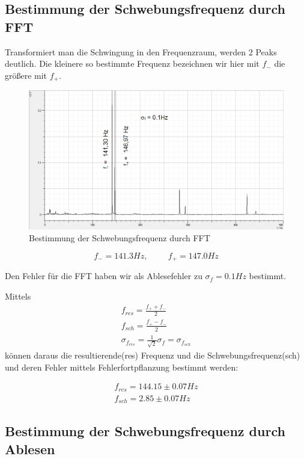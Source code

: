 \documentclass[12pt,a4paper]{article}
\begin{document}
\subsection{Bestimmung der Schwebungsfrequenz durch FFT}
Transformiert man die Schwingung in den Frequenzraum, werden 2 Peaks deutlich. Die kleinere so bestimmte Frequenz bezeichnen wir hier mit $f_-$ die größere mit $f_+$.
\begin{figure}[H]
\centering
\includegraphics[scale=0.5]{schwebung/Schwebung_FFT.png}
\caption{Bestimmung der Schwebungsfrequenz durch FFT}
\end{figure}

\begin{equation}
f_-=141.3 Hz, \hspace{1cm} f_+=147.0 Hz
\end{equation}

Den Fehler für die FFT haben wir als Ablesefehler zu $ \sigma_f=0.1Hz$ bestimmt.

Mittels
\begin{align}
f_{res}=\frac{f_+ + f_-}{2} \\
f_{sch}=\frac{f_+ - f_-}{2} \\
\sigma_{f_{res}}=\frac{1}{\sqrt{2}}\sigma_f=\sigma_{f_{sch}}
\end{align}
können daraus die resultierende(res) Frequenz und die  Schwebungsfrequenz(sch) und deren Fehler mittels Fehlerfortpflanzung bestimmt werden:

\begin{align}
f_{res}=144.15 \pm 0.07 Hz\\
f_{sch}=2.85 \pm 0.07 Hz
\end{align}

\subsection{Bestimmung der Schwebungsfrequenz durch Ablesen}
\end{document}
